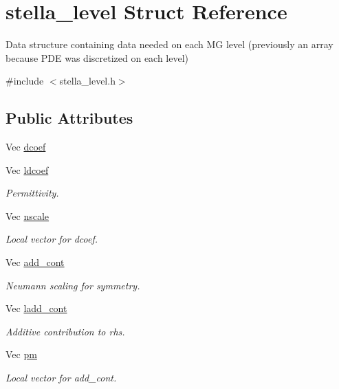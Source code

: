 \hypertarget{structstella__level}{}\section{stella\+\_\+level Struct Reference}
\label{structstella__level}


Data structure containing data needed on each MG level (previously an array because P\+DE was discretized on each level)  




{\ttfamily \#include $<$stella\+\_\+level.\+h$>$}

\subsection*{Public Attributes}
\begin{DoxyCompactItemize}
\item 
Vec \mbox{\hyperlink{structstella__level_aaa318f6ecfb6e08c4456cebb0313f62f}{dcoef}}
\item 
Vec \mbox{\hyperlink{structstella__level_a6e9c8a6d2efc75b6c0ef465efa8852c3}{ldcoef}}
\begin{DoxyCompactList}\small\item\em Permittivity. \end{DoxyCompactList}\item 
Vec \mbox{\hyperlink{structstella__level_ab071c1ffcf3f85e82f3074e7f19de16f}{nscale}}
\begin{DoxyCompactList}\small\item\em Local vector for dcoef. \end{DoxyCompactList}\item 
Vec \mbox{\hyperlink{structstella__level_a13d222e51aeebee890e03a212e5da952}{add\+\_\+cont}}
\begin{DoxyCompactList}\small\item\em Neumann scaling for symmetry. \end{DoxyCompactList}\item 
Vec \mbox{\hyperlink{structstella__level_ab0497b48a8d021c80b5ed9edede17762}{ladd\+\_\+cont}}
\begin{DoxyCompactList}\small\item\em Additive contribution to rhs. \end{DoxyCompactList}\item 
Vec \mbox{\hyperlink{structstella__level_a7d96ccadbcc7b34ba474a9c4780c30b6}{pm}}
\begin{DoxyCompactList}\small\item\em Local vector for add\+\_\+cont. \end{DoxyCompactList}\item 

\end{DoxyCompactItemize}
